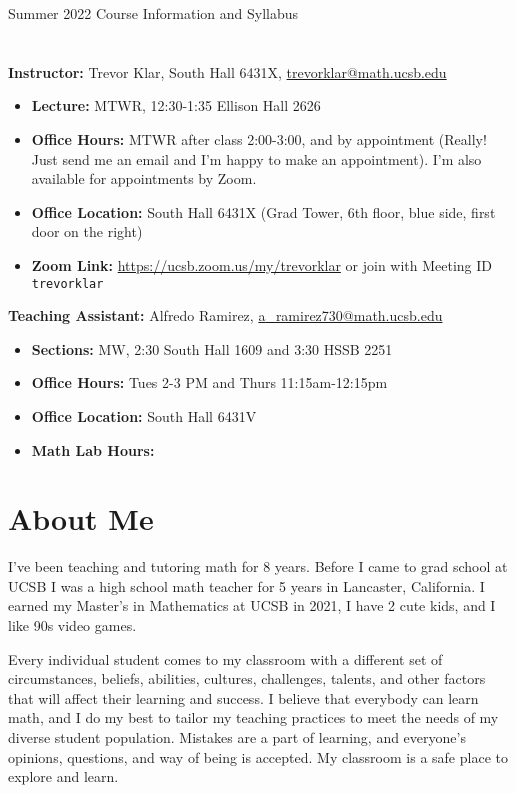 \documentclass[11pt,letterpaper]{article}
\begin{document}
\thispagestyle{fancy}
\begin{center}
{\Large Summer 2022 Course Information and Syllabus} 
\end{center}

\section*{}
\textbf{Instructor:} Trevor Klar, South Hall 6431X, \href{mailto:trevorklar@math.ucsb.edu}{trevorklar@math.ucsb.edu} 
\begin{itemize}[nosep]
\item \textbf{Lecture:} MTWR, 12:30-1:35 Ellison Hall 2626 
\item \textbf{Office Hours:} MTWR after class 2:00-3:00, and by appointment (Really! Just send me an email and I'm happy to make an appointment). I'm also available for appointments by Zoom. 
\item \textbf{Office Location:} South Hall 6431X (Grad Tower, 6th floor, blue side, first door on the right)
\item \textbf{Zoom Link:} \href{https://ucsb.zoom.us/my/trevorklar}{https://ucsb.zoom.us/my/trevorklar} or join with Meeting ID \texttt{trevorklar}
\end{itemize}
\noindent \textbf{Teaching Assistant:} Alfredo Ramirez, \href{mailto:a_ramirez730@math.ucsb.edu}{a{\_}ramirez730@math.ucsb.edu}
\begin{itemize}[nosep]
\item \textbf{Sections:} MW, 2:30 South Hall 1609 and 3:30 HSSB 2251
\item \textbf{Office Hours:} Tues 2-3 PM and Thurs 11:15am-12:15pm
\item \textbf{Office Location:} South Hall 6431V
\item \textbf{Math Lab Hours:} 
\end{itemize}

\section*{About Me}
I've been teaching and tutoring math for 8 years. Before I came to grad school at UCSB I was a high school math teacher for 5 years in Lancaster, California. I earned my Master's in Mathematics at UCSB in 2021, I have 2 cute kids, and I like 90s video games. 

Every individual student comes to my classroom with a different set of circumstances, beliefs, abilities, cultures, challenges, talents, and other factors that will affect their learning and success. I believe that everybody can learn math, and I do my best to tailor my teaching practices to meet the needs of my diverse student population. Mistakes are a part of learning, and everyone's opinions, questions, and way of being is accepted. My classroom is a safe place to explore and learn. 
\end{document}
